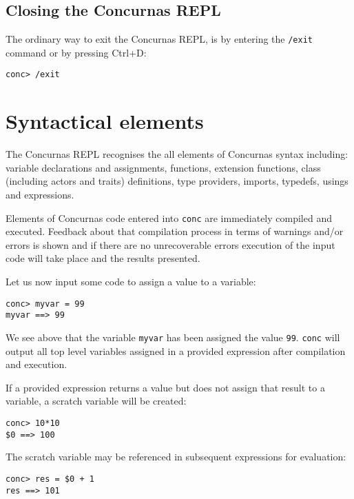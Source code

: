 \documentclass[conc-doc]{subfiles}
\begin{document}
\subsection{Closing the Concurnas REPL}
The ordinary way to exit the Concurnas REPL, is by entering the \lstinline[language=None]{/exit} command or by pressing Ctrl+D:

\begin{lstlisting}[language=None]
conc> /exit
\end{lstlisting}


\section{Syntactical elements}
The Concurnas REPL recognises the all elements of Concurnas syntax including: variable declarations and assignments, functions, extension functions, class (including actors and traits) definitions, type providers, imports, typedefs, usings and expressions.

Elements of Concurnas code entered into \lstinline[language=None]{conc} are immediately compiled and executed. Feedback about that compilation process in terms of warnings and/or errors is shown and if there are no unrecoverable errors execution of the input code will take place and the results presented.
	
Let us now input some code to assign a value to a variable:

\begin{lstlisting}[language=None]
conc> myvar = 99
myvar ==> 99
\end{lstlisting}

We see above that the variable \lstinline[language=None]{myvar} has been assigned the value \lstinline[language=None]{99}. \lstinline[language=None]{conc} will output all top level variables assigned in a provided expression after compilation and execution.

If a provided expression returns a value but does not assign that result to a variable, a scratch variable will be created:

\begin{lstlisting}[language=None]
conc> 10*10
$0 ==> 100
\end{lstlisting}

The scratch variable may be referenced in subsequent expressions for evaluation:
\begin{lstlisting}[language=None]
conc> res = $0 + 1
res ==> 101
\end{lstlisting}
\end{document}
